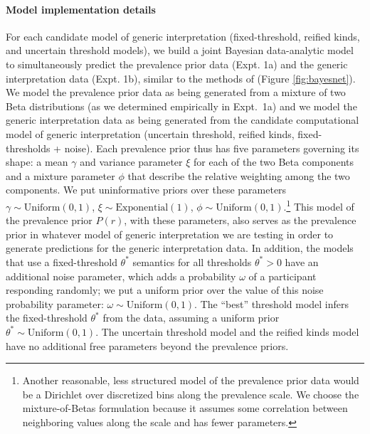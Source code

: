 \documentclass[floatsintext,doc]{apa6}
\let\oldparagraph\paragraph
\renewcommand{\paragraph}[1]{\oldparagraph{#1}\mbox{}}
\let\rmarkdownfootnote\footnote%
\def\footnote{\protect\rmarkdownfootnote}
\begin{document}
\paragraph{Model implementation details} 
For each candidate model of generic interpretation (fixed-threshold, reified kinds, and uncertain threshold models), we build a joint Bayesian data-analytic model to simultaneously predict the prevalence prior data (Expt. 1a) and the generic interpretation data (Expt. 1b), similar to the methods of  (Figure \ref{fig:bayesnet}).
We model the prevalence prior data as being generated from a mixture of two Beta distributions (as we determined empirically in Expt.~1a) and we model the generic interpretation data as being generated from the candidate computational model of generic interpretation (uncertain threshold, reified kinds, fixed-thresholds + noise).
Each prevalence prior thus has five parameters governing its shape: a mean \(\gamma\) and variance parameter \(\xi\) for each of the two Beta components and a mixture parameter $\phi$ that describe the relative weighting among the two components.
We put uninformative priors over these parameters \(\gamma \sim \text{Uniform}(0, 1)\), \(\xi \sim \text{Exponential}(1)\), \(\phi \sim \text{Uniform}(0,1)\).\footnote{Another reasonable, less structured model of the prevalence prior data would be a Dirichlet over discretized bins along the prevalence scale. We choose the mixture-of-Betas formulation because it assumes some correlation between neighboring values along the scale and has fewer parameters. }
This model of the prevalence prior \(P(r)\), with these parameters, also serves as the prevalence prior in whatever model of generic interpretation we are testing in order to generate predictions for the generic interpretation data. 
In addition, the models that use a fixed-threshold $\theta^*$ semantics for all thresholds $\theta^* > 0$ have an additional noise parameter, which adds a probability \(\omega\) of a participant responding randomly; we put a uniform prior over the value of this noise probability parameter: \(\omega \sim \text{Uniform}(0, 1)\).
The ``best'' threshold model infers the fixed-threshold $\theta^*$ from the data, assuming a uniform prior \(\theta^* \sim \text{Uniform}(0, 1)\).
The uncertain threshold model and the reified kinds model have no additional free parameters beyond the prevalence priors. 
\end{document}
